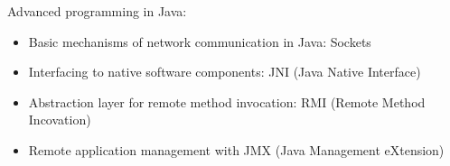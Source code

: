 Advanced programming in Java:
\begin{itemize}
    \item Basic mechanisms of network communication in Java: Sockets
    \item Interfacing to native software components: JNI (Java Native Interface)
    \item Abstraction layer for remote method invocation: RMI (Remote Method Incovation)
    \item Remote application management with JMX (Java Management eXtension)
\end{itemize}